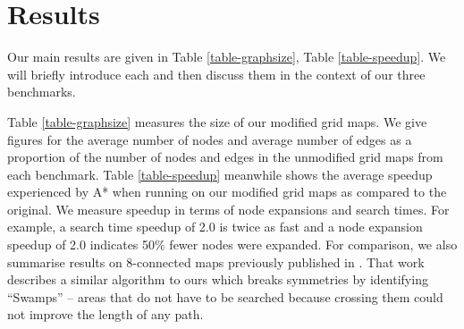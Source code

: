 \section{Results}
\label{sec-results}



Our main results are given in Table \ref{table-graphsize}, Table
\ref{table-speedup}.
We will briefly introduce each and then discuss them in the context
of our three benchmarks.
\par
Table \ref{table-graphsize} measures the size of our modified grid maps.
We give figures for the average number of nodes and average number of edges
as a proportion of the number of nodes and edges in the unmodified grid maps
from each benchmark. 
Table \ref{table-speedup} meanwhile shows the average speedup experienced
by A* when running on our modified grid maps as compared to the
original.  We measure speedup in terms of node expansions and search
times.  For example, a search time speedup of 2.0 is twice as fast and
a node expansion speedup of 2.0 indicates 50\% fewer nodes were expanded.
For comparison, we also summarise results on 8-connected maps previously published in \cite{pochter10}.
That work describes a similar algorithm to ours which breaks symmetries by identifying ``Swamps'' --
areas that do not have to be searched because crossing them could not improve the length of any path.
 


